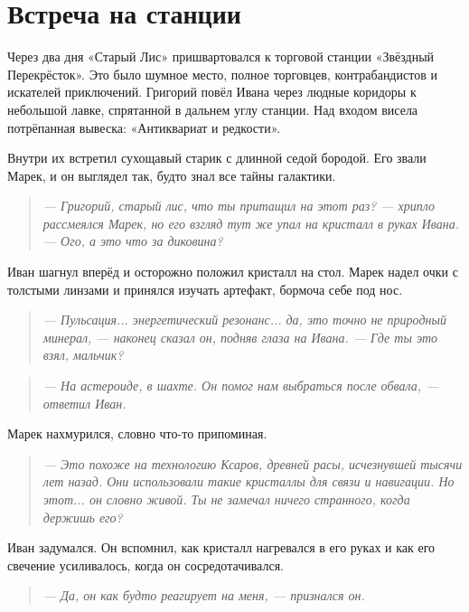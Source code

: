 \documentclass[12pt,a4paper]{book}
\newenvironment{dialogue}{\begin{quote}\itshape}{\end{quote}} %
\begin{document}
\section*{Встреча на станции}

Через два дня «Старый Лис» пришвартовался к торговой станции «Звёздный Перекрёсток». Это было шумное место, полное торговцев, контрабандистов и искателей приключений. Григорий повёл Ивана через людные коридоры к небольшой лавке, спрятанной в дальнем углу станции. Над входом висела потрёпанная вывеска: «Антиквариат и редкости».

Внутри их встретил сухощавый старик с длинной седой бородой. Его звали Марек, и он выглядел так, будто знал все тайны галактики.

\begin{dialogue}
--- Григорий, старый лис, что ты притащил на этот раз? --- хрипло рассмеялся Марек, но его взгляд тут же упал на кристалл в руках Ивана. --- Ого, а это что за диковина?
\end{dialogue}

Иван шагнул вперёд и осторожно положил кристалл на стол. Марек надел очки с толстыми линзами и принялся изучать артефакт, бормоча себе под нос.

\begin{dialogue}
--- Пульсация... энергетический резонанс... да, это точно не природный минерал, --- наконец сказал он, подняв глаза на Ивана. --- Где ты это взял, мальчик?
\end{dialogue}

\begin{dialogue}
--- На астероиде, в шахте. Он помог нам выбраться после обвала, --- ответил Иван.
\end{dialogue}

Марек нахмурился, словно что-то припоминая.

\begin{dialogue}
--- Это похоже на технологию Ксаров, древней расы, исчезнувшей тысячи лет назад. Они использовали такие кристаллы для связи и навигации. Но этот... он словно живой. Ты не замечал ничего странного, когда держишь его?
\end{dialogue}

Иван задумался. Он вспомнил, как кристалл нагревался в его руках и как его свечение усиливалось, когда он сосредотачивался.

\begin{dialogue}
--- Да, он как будто реагирует на меня, --- признался он.
\end{dialogue}
\end{document}
